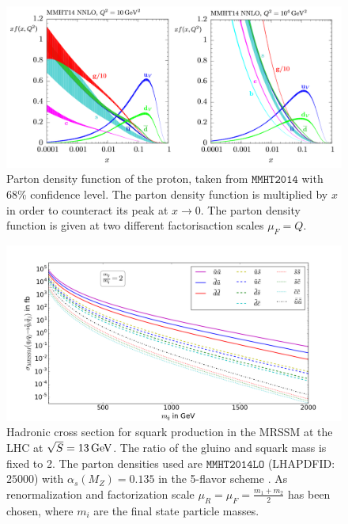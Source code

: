 \begin{figure}[!htbp]
\begin{center}
\includegraphics[scale=0.6]{figures/pdf's}
\caption{Parton density function of the proton, taken from $\mathtt{MMHT2014}$ \cite{Harland-Lang:2014zoa} with 68\% confidence level. The parton density function is multiplied by $x$ in order to counteract its peak at $x \to 0$. The parton density function is given at two different factorisaction scales $\mu_F = Q$.}\label{fig:pdfs}
\end{center}
\end{figure}
\begin{figure}[!htpb]
\begin{center}
\includegraphics[scale=.45]{figures/MRSSM_q+q_sq+sq_mr=2_seperated}
\caption{Hadronic cross section for squark production in the MRSSM at the LHC at $\sqrt{S} = \unit[13]{GeV}$. The ratio of the gluino and squark mass is fixed to 2. The parton densities used are $\mathtt{MMHT2014LO}$ (LHAPDFID:$25000$) with $\alpha_s(M_Z) = 0.135$ in the 5-flavor scheme \cite{Harland-Lang:2014zoa}. As renormalization and factorization scale $\mu_R = \mu_F = \frac{m_1 + m_2}{2}$ has been chosen, where $m_i$ are the final state particle masses.} \label{fig:TreeXsection}
\end{center}
\end{figure}\\
